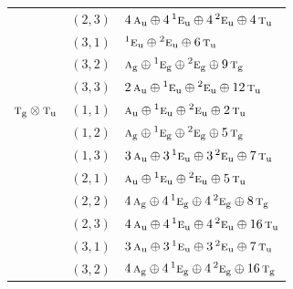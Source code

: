 \documentclass[11pt]{article}
\newcommand{\irr}[1]{\text{\normalfont\scshape #1}}
\newcommand{\conjpair}[1]{{}^{#1}}
\newcommand{\ptag}[1]{\mathrm{#1}}
\begin{document}
\begin{longtable}{p{} c p{}}
 & $(2,3)$ & $4\,\irr{a}_{\ptag{u}}\oplus 4\,\conjpair{1}\irr{e}_{\ptag{u}}\oplus 4\,\conjpair{2}\irr{e}_{\ptag{u}}\oplus 4\,\irr{t}_{\ptag{u}}$\\

 & $(3,1)$ & $\conjpair{1}\irr{e}_{\ptag{u}}\oplus \conjpair{2}\irr{e}_{\ptag{u}}\oplus 6\,\irr{t}_{\ptag{u}}$\\

 & $(3,2)$ & $\irr{a}_{\ptag{g}}\oplus \conjpair{1}\irr{e}_{\ptag{g}}\oplus \conjpair{2}\irr{e}_{\ptag{g}}\oplus 9\,\irr{t}_{\ptag{g}}$\\

 & $(3,3)$ & $2\,\irr{a}_{\ptag{u}}\oplus \conjpair{1}\irr{e}_{\ptag{u}}\oplus \conjpair{2}\irr{e}_{\ptag{u}}\oplus 12\,\irr{t}_{\ptag{u}}$\\

\hline

$\irr{t}_{\ptag{g}}\otimes \irr{t}_{\ptag{u}}$ & $(1,1)$ & $\irr{a}_{\ptag{u}}\oplus \conjpair{1}\irr{e}_{\ptag{u}}\oplus \conjpair{2}\irr{e}_{\ptag{u}}\oplus 2\,\irr{t}_{\ptag{u}}$\\

 & $(1,2)$ & $\irr{a}_{\ptag{g}}\oplus \conjpair{1}\irr{e}_{\ptag{g}}\oplus \conjpair{2}\irr{e}_{\ptag{g}}\oplus 5\,\irr{t}_{\ptag{g}}$\\

 & $(1,3)$ & $3\,\irr{a}_{\ptag{u}}\oplus 3\,\conjpair{1}\irr{e}_{\ptag{u}}\oplus 3\,\conjpair{2}\irr{e}_{\ptag{u}}\oplus 7\,\irr{t}_{\ptag{u}}$\\

 & $(2,1)$ & $\irr{a}_{\ptag{u}}\oplus \conjpair{1}\irr{e}_{\ptag{u}}\oplus \conjpair{2}\irr{e}_{\ptag{u}}\oplus 5\,\irr{t}_{\ptag{u}}$\\

 & $(2,2)$ & $4\,\irr{a}_{\ptag{g}}\oplus 4\,\conjpair{1}\irr{e}_{\ptag{g}}\oplus 4\,\conjpair{2}\irr{e}_{\ptag{g}}\oplus 8\,\irr{t}_{\ptag{g}}$\\

 & $(2,3)$ & $4\,\irr{a}_{\ptag{u}}\oplus 4\,\conjpair{1}\irr{e}_{\ptag{u}}\oplus 4\,\conjpair{2}\irr{e}_{\ptag{u}}\oplus 16\,\irr{t}_{\ptag{u}}$\\

 & $(3,1)$ & $3\,\irr{a}_{\ptag{u}}\oplus 3\,\conjpair{1}\irr{e}_{\ptag{u}}\oplus 3\,\conjpair{2}\irr{e}_{\ptag{u}}\oplus 7\,\irr{t}_{\ptag{u}}$\\

 & $(3,2)$ & $4\,\irr{a}_{\ptag{g}}\oplus 4\,\conjpair{1}\irr{e}_{\ptag{g}}\oplus 4\,\conjpair{2}\irr{e}_{\ptag{g}}\oplus 16\,\irr{t}_{\ptag{g}}$\\


\end{longtable}
\end{document}
